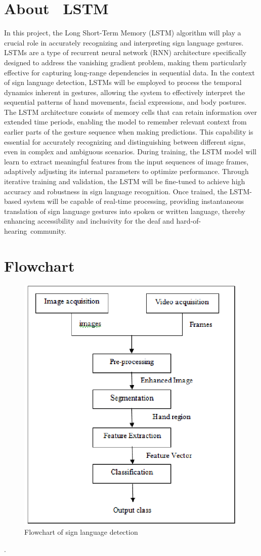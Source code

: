 \section{About  LSTM}
In this project, the Long Short-Term Memory (LSTM) algorithm will play a crucial role in accurately recognizing and interpreting sign language gestures. LSTMs are a type of recurrent neural network (RNN) architecture specifically designed to address the vanishing gradient problem, making them particularly effective for capturing long-range dependencies in sequential data. In the context of sign language detection, LSTMs will be employed to process the temporal dynamics inherent in gestures, allowing the system to effectively interpret the sequential patterns of hand movements, facial expressions, and body postures. The LSTM architecture consists of memory cells that can retain information over extended time periods, enabling the model to remember relevant context from earlier parts of the gesture sequence when making predictions. This capability is essential for accurately recognizing and distinguishing between different signs, even in complex and ambiguous scenarios. During training, the LSTM model will learn to extract meaningful features from the input sequences of image frames, adaptively adjusting its internal parameters to optimize performance. Through iterative training and validation, the LSTM will be fine-tuned to achieve high accuracy and robustness in sign language recognition. Once trained, the LSTM-based system will be capable of real-time processing, providing instantaneous translation of sign language gestures into spoken or written language, thereby enhancing accessibility and inclusivity for the deaf and hard-of-hearing community. 


\section{Flowchart}

\begin{figure}[ht]
    \centering
    \includegraphics[width=1.0\linewidth]{images/flowchart.1.png}
    \caption{Flowchart of sign language detection}
    \label{fig:flowchart-sign-language}
\end{figure}

.